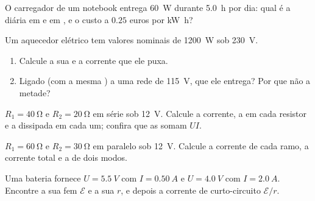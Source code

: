 \begin{exercise}[$\star$]\label{exo:g11:circuits-and-power:5}
O carregador de um notebook entrega \qty{60}{W} durante \qty{5.0}{h} por
dia: qual é a  diária em  e em , e o custo a
$0.25$ euros por \unit{kW.h}?
\end{exercise}

\begin{exercise}[$\star\star$]\label{exo:g11:circuits-and-power:6}
Um aquecedor elétrico tem valores nominais de \qty{1200}{W} sob
\qty{230}{V}.
\begin{enumerate}
  \item Calcule a sua  e a corrente que ele puxa.
  \item Ligado (com a mesma ) a uma rede de \qty{115}{V}, que
         ele entrega? Por que não a metade?
\end{enumerate}
\end{exercise}

\begin{exercise}[$\star\star$]\label{exo:g11:circuits-and-power:7}
$R_1 = \qty{40}{\ohm}$ e $R_2 = \qty{20}{\ohm}$ em série sob \qty{12}{V}.
Calcule a corrente, a  em cada resistor e a  dissipada em
cada um; confira que as  somam $UI$.
\end{exercise}

\begin{exercise}[$\star\star$]\label{exo:g11:circuits-and-power:8}
$R_1 = \qty{60}{\ohm}$ e $R_2 = \qty{30}{\ohm}$ em paralelo sob
\qty{12}{V}. Calcule a corrente de cada ramo, a corrente total e a
 de dois modos.
\end{exercise}

\begin{exercise}[$\star\star$]\label{exo:g11:circuits-and-power:9}
Uma bateria fornece $U = \qty{5.5}{V}$ com $I = \qty{0.50}{A}$ e
$U = \qty{4.0}{V}$ com $I = \qty{2.0}{A}$. Encontre a sua fem
$\mathcal{E}$ e a sua  $r$, e depois a corrente de
curto-circuito $\mathcal{E}/r$.
\end{exercise}

